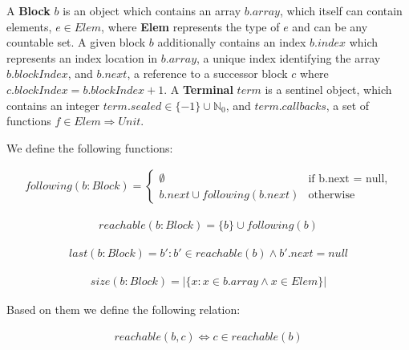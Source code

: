 \documentclass[runningheads,a4paper]{llncs}
\begin{document}
\begin{definition}
A \textbf{Block} $b$ is an object which
contains an array $b.array$, which itself can contain elements, $e \in Elem$,
where \textbf{Elem} represents the type of $e$ and can be any countable set. A
given block $b$ additionally contains an index $b.index$ which represents an
index location in $b.array$, a unique index identifying the array
$b.blockIndex$, and $b.next$, a reference to a successor block $c$ where
$c.blockIndex = b.blockIndex + 1$. A \textbf{Terminal} $term$ is a sentinel
object, which contains an integer $term.sealed \in \{-1\} \cup \mathbb{N}_0$, and
$term.callbacks$, a set of functions $f \in Elem \Rightarrow Unit$.

We define the following functions:

\begin{eqnarray*}
following(b: Block) = 
\begin{cases}
\emptyset & \text{if b.next = null,}
\\
b.next \cup following(b.next) & \text{otherwise}
\end{cases}
\end{eqnarray*}

\begin{eqnarray*}
reachable(b: Block) = \{ b \} \cup following(b)
\end{eqnarray*}

\begin{eqnarray*}
last(b: Block) = b' : b' \in reachable(b) \wedge b'.next = null
\end{eqnarray*}

\begin{eqnarray*}
size(b: Block) = | \{ x : x \in b.array \wedge x \in Elem \} |
\end{eqnarray*}

Based on them we define the following relation:

\begin{eqnarray*}
reachable(b, c) \Leftrightarrow c \in reachable(b)
\end{eqnarray*}
\end{definition}
\end{document}
